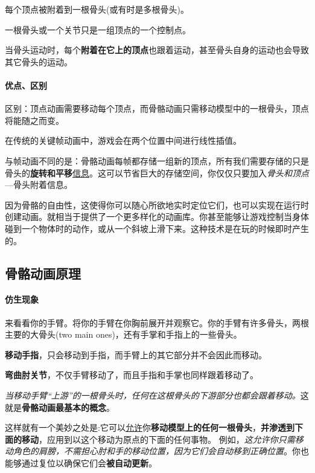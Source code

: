 \documentclass[UTF8,a4paper,12pt]{ctexbook}
\begin{document}
			每个顶点被附着到一根骨头(或有时是多根骨头)。
			
			一根骨头或一个关节只是一组顶点的一个控制点。
			
			当骨头运动时，每个\textbf{附着在它上的顶点}也跟着运动，甚至骨头自身的运动也会导致其它骨头的运动。
			
			
			\paragraph{优点、区别}
			
				区别：顶点动画需要移动每个顶点，而骨骼动画只需移动模型中的一根骨头，顶点将能随之而变。
				
				在传统的关键帧动画中，游戏会在两个位置中间进行线性插值。
				
				与帧动画不同的是：骨骼动画每帧都存储一组新的顶点，所有我们需要存储的只是骨头的\textbf{旋转和平移}\underline{信息}。这可以节省巨大的存储空间，你仅仅只要加入\textit{骨头和顶点}—骨头附着信息。
				
				因为骨骼的自由性，这使得你可以随心所欲地实时定位它们，也可以实现在运行时创建动画。就相当于提供了一个更多样化的动画库。你甚至能够让游戏控制当身体碰到一个物体时的动作，或从一个斜坡上滑下来。这种技术是在玩的时候即时产生的。

		\subsection{骨骼动画原理}
			\paragraph{仿生现象}
				来看看你的手臂。将你的手臂在你胸前展开并观察它。你的手臂有许多骨头，两根主要的大骨头(two main ones)，还有手掌和手指上的一些骨头。
				
				\textbf{移动手指}，只会移动到手指，而手臂上的其它部分并不会因此而移动。
				
				\textbf{弯曲肘关节}，不仅手臂移动了，而且手指和手掌也同样跟着移动了。
				
				\textit{当移动手臂“上游”的一根骨头时，任何在这根骨头的下游部分也都会跟着移动。}这就是\textbf{骨骼动画最基本的概念}。
				
				这样就有一个美妙之处是:它可以\underline{允许}你\textbf{移动模型上的任何一根骨头}，\textbf{并渗透到下面的移动}，应用到以这个移动为原点的下面的任何事物。 例如，\textit{这允许你只需移动角色的肩膀，不需担心肘和手的移动位置，因为它们会自动移到正确位置}。你也能够通过复位以确保它们会\textbf{被自动更新}。
				
\end{document}
